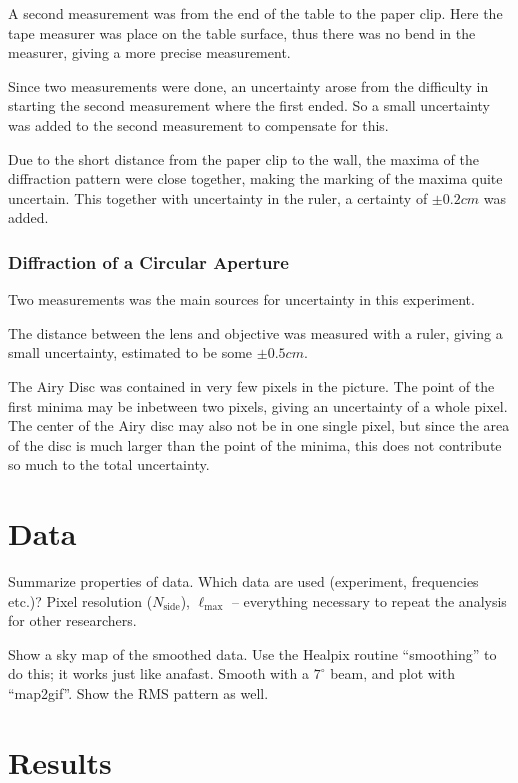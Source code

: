 \documentclass{emulateapj}
\begin{document}
A second measurement was from the end of the table to the paper clip. Here the tape measurer was place on the table surface, thus there was no bend in the measurer, giving a more precise measurement. 

Since two measurements were done, an uncertainty arose from the difficulty in starting the second measurement where the first ended. So a small uncertainty was added to the second measurement to compensate for this.

Due to the short distance from the paper clip to the wall, the maxima of the diffraction pattern were close together, making the marking of the maxima quite uncertain. This together with uncertainty in the ruler, a certainty of $\pm 0.2 cm$ was added. 

\subsubsection{Diffraction of a Circular Aperture}
Two measurements was the main sources for uncertainty in this experiment.

The distance between the lens and objective was measured with a ruler, giving a small uncertainty, estimated to be some $\pm 0.5 cm$.

The Airy Disc was contained in very few pixels in the picture. The point of the first minima may be inbetween two pixels, giving an uncertainty of a whole pixel. The center of the Airy disc may also not be in one single pixel, but since the area of the disc is much larger than the point of the minima, this does not contribute so much to the total uncertainty.

\section{Data}
\label{sec:data}

Summarize properties of data. Which data are used (experiment,
frequencies etc.)? Pixel resolution ($N_{\textrm{side}}$),
$\ell_{\textrm{max}}$ -- everything necessary to repeat the analysis
for other researchers.

Show a sky map of the smoothed data. Use the Healpix routine
``smoothing'' to do this; it works just like anafast. Smooth with a
$7^{\circ}$ beam, and plot with ``map2gif''. Show the RMS pattern as
well. 

\section{Results}
\label{sec:results}
\end{document}
